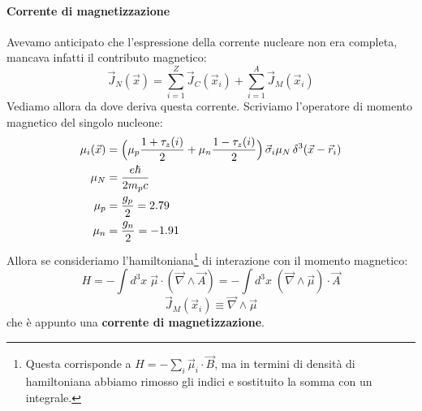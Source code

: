 \paragraph{Corrente di magnetizzazione} Avevamo anticipato che l'espressione della corrente nucleare non era completa, mancava infatti il contributo magnetico:
$$\vec{J}_N(\vec{x}) = \sum_{i=1}^Z \vec{J}_C(\vec{x}_i) + \sum_{i=1}^A \vec{J}_M (\vec{x}_i)$$
Vediamo allora da dove deriva questa corrente. Scriviamo l'operatore di momento magnetico del singolo nucleone:
\begin{displaymath}
\begin{aligned}
\mu_i (\vec{x}) &= \Bigl ( \mu_p \frac{1+\tau_z(i)}{2} + \mu_n \frac{1-\tau_z(i)}{2} \Bigr )\, \vec{\sigma}_i \mu_N \, \delta^3(\vec{x}-\vec{r}_i) \\
\mu_N &= \frac{e\hbar}{2m_pc} \\
\mu_p &= \frac{g_p}{2} = 2.79 \\
\mu_n &= \frac{g_n}{2} = -1.91
\end{aligned}
\end{displaymath}
Allora se consideriamo l'hamiltoniana\footnote{Questa corrisponde a $H = -\sum_i \vec{\mu}_i \cdot \vec{B}$, ma in termini di densità di hamiltoniana abbiamo rimosso gli indici e sostituito la somma con un integrale.} di interazione con il momento magnetico:
$$H = -\int d^3x \; \vec{\mu}\cdot(\vec{\nabla}\land \vec{A}) = -\int d^3x \; (\vec{\nabla}\land\vec{\mu})\cdot \vec{A} $$
$$\vec{J}_M (\vec{x}_i) \equiv \vec{\nabla}\land\vec{\mu}$$
che è appunto una \textbf{corrente di magnetizzazione}.